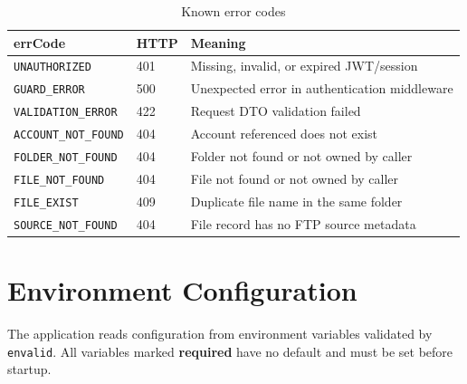 \documentclass[12pt,a4paper]{article}
\begin{document}
\begin{table}[h!]
\centering
\begin{tabularx}{\linewidth}{llX}
\toprule
\textbf{errCode} & \textbf{HTTP} & \textbf{Meaning} \\
\midrule
\texttt{UNAUTHORIZED}       & 401 & Missing, invalid, or expired JWT/session \\
\texttt{GUARD\_ERROR}       & 500 & Unexpected error in authentication middleware \\
\texttt{VALIDATION\_ERROR}  & 422 & Request DTO validation failed \\
\texttt{ACCOUNT\_NOT\_FOUND}& 404 & Account referenced does not exist \\
\texttt{FOLDER\_NOT\_FOUND} & 404 & Folder not found or not owned by caller \\
\texttt{FILE\_NOT\_FOUND}   & 404 & File not found or not owned by caller \\
\texttt{FILE\_EXIST}        & 409 & Duplicate file name in the same folder \\
\texttt{SOURCE\_NOT\_FOUND} & 404 & File record has no FTP source metadata \\
\bottomrule
\end{tabularx}
\caption{Known error codes}
\end{table}

\newpage

\section{Environment Configuration}

The application reads configuration from environment variables validated by \texttt{envalid}. All variables marked \textbf{required} have no default and must be set before startup.
\end{document}
